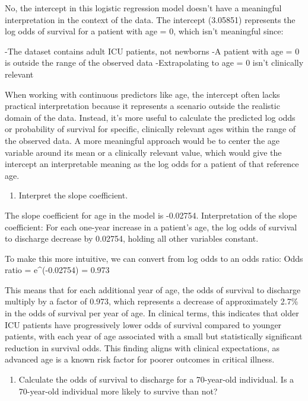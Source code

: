\documentclass[
]{article}
\providecommand{\tightlist}{%
  \setlength{\itemsep}{0pt}\setlength{\parskip}{0pt}}
\begin{document}
No, the intercept in this logistic regression model doesn't have a
meaningful interpretation in the context of the data. The intercept
(3.05851) represents the log odds of survival for a patient with age =
0, which isn't meaningful since:

-The dataset contains adult ICU patients, not newborns -A patient with
age = 0 is outside the range of the observed data -Extrapolating to age
= 0 isn't clinically relevant

When working with continuous predictors like age, the intercept often
lacks practical interpretation because it represents a scenario outside
the realistic domain of the data. Instead, it's more useful to calculate
the predicted log odds or probability of survival for specific,
clinically relevant ages within the range of the observed data. A more
meaningful approach would be to center the age variable around its mean
or a clinically relevant value, which would give the intercept an
interpretable meaning as the log odds for a patient of that reference
age.

\begin{enumerate}
\def\labelenumi{\alph{enumi})}
\setcounter{enumi}{2}
\tightlist
\item
  Interpret the slope coefficient.
\end{enumerate}

The slope coefficient for age in the model is -0.02754. Interpretation
of the slope coefficient: For each one-year increase in a patient's age,
the log odds of survival to discharge decrease by 0.02754, holding all
other variables constant.

To make this more intuitive, we can convert from log odds to an odds
ratio: Odds ratio = e\^{}(-0.02754) = 0.973

This means that for each additional year of age, the odds of survival to
discharge multiply by a factor of 0.973, which represents a decrease of
approximately 2.7\% in the odds of survival per year of age. In clinical
terms, this indicates that older ICU patients have progressively lower
odds of survival compared to younger patients, with each year of age
associated with a small but statistically significant reduction in
survival odds. This finding aligns with clinical expectations, as
advanced age is a known risk factor for poorer outcomes in critical
illness.

\begin{enumerate}
\def\labelenumi{\alph{enumi})}
\setcounter{enumi}{3}
\tightlist
\item
  Calculate the odds of survival to discharge for a 70-year-old
  individual. Is a 70-year-old individual more likely to survive than
  not?
\end{enumerate}
\end{document}
